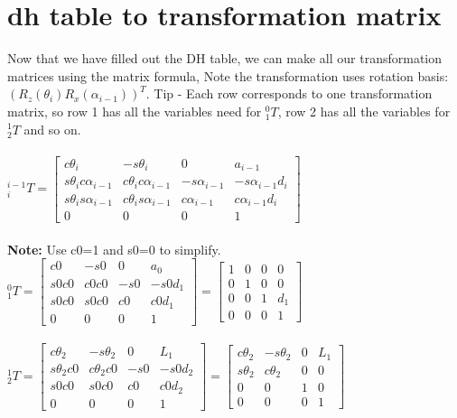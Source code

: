 \documentclass{article}
\begin{document}
\section{dh table to transformation matrix}
Now that we have filled out the DH table, we can make all our transformation matrices using the matrix formula, Note the transformation uses rotation basis: $(R_z(\theta_i)R_x(\alpha_{i-1}))^T$. Tip - Each row corresponds to one transformation matrix, so row 1 has all the variables need for ${}^0_1T$, row 2 has all the variables for ${}^1_2T$ and so on.\\\\
${}^{i-1}_{i}T=\begin{bmatrix}
c\theta_i & -s\theta_i & 0 & a_{i-1}\\
s\theta_ic\alpha_{i-1} & c\theta_ic\alpha_{i-1} & -s\alpha_{i-1} & -s\alpha_{i-1}d_{i}\\
s\theta_is\alpha_{i-1} & c\theta_is\alpha_{i-1} & c\alpha_{i-1} & c\alpha_{i-1}d_{i}\\
                0 & 0 & 0 & 1
\end{bmatrix}$\\\\
\textbf{Note: } Use c0=1 and s0=0 to simplify.\\
${}^{0}_{1}T=
\begin{bmatrix}
c0 & -s0 & 0 & a_0\\
s0c0 & c0c0 & -s0 & -s0d_1\\
s0c0 & s0c0 & c0 & c0d_1\\
0 & 0 & 0 & 1
\end{bmatrix}=
\begin{bmatrix}
1 & 0 & 0 & 0\\
0 & 1 & 0 & 0\\
0 & 0 & 1 & d_1\\
0 & 0 & 0 & 1
\end{bmatrix}$\\\\
${}^{1}_{2}T=
\begin{bmatrix}
c\theta_2 & -s\theta_2 & 0 & L_1\\
s\theta_2c0 & c\theta_2c0 & -s0 & -s0d_2\\
s0c0 & s0c0 & c0 & c0d_2\\
0 & 0 & 0 & 1
\end{bmatrix}=
\begin{bmatrix}
c\theta_2 & -s\theta_2 & 0 & L_1\\
s\theta_2 & c\theta_2 & 0 & 0\\
0 & 0 & 1 & 0\\
0 & 0 & 0 & 1
\end{bmatrix}$\\\\
\end{document}
